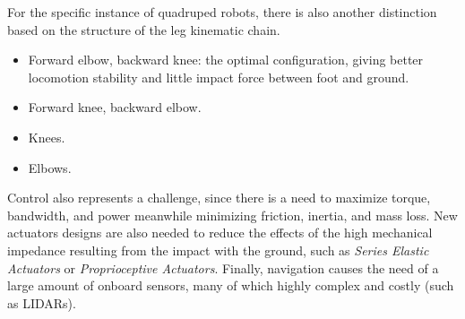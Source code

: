 For the specific instance of quadruped robots, there is also another distinction based on the structure of the leg kinematic chain.
\begin{itemize}
    \item Forward elbow, backward knee: the optimal configuration, giving better locomotion stability and little impact force between foot and ground.
    \item Forward knee, backward elbow.
    \item Knees.
    \item Elbows.
\end{itemize}
Control also represents a challenge, since there is a need to maximize torque, bandwidth, and power meanwhile minimizing friction, inertia, and mass loss. New actuators designs are also needed to reduce the effects of the high mechanical impedance resulting from the impact with the ground, such as \textit{Series Elastic Actuators} or \textit{Proprioceptive Actuators}. Finally, navigation causes the need of a large amount of onboard sensors, many of which highly complex and costly (such as LIDARs).
